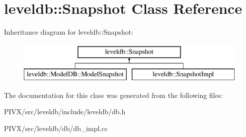 \hypertarget{classleveldb_1_1_snapshot}{}\section{leveldb\+:\+:Snapshot Class Reference}
\label{classleveldb_1_1_snapshot}
Inheritance diagram for leveldb\+:\+:Snapshot\+:\begin{figure}[H]
\begin{center}
\leavevmode
\includegraphics[height=2.000000cm]{classleveldb_1_1_snapshot}
\end{center}
\end{figure}


The documentation for this class was generated from the following files\+:\begin{DoxyCompactItemize}
\item 
P\+I\+V\+X/src/leveldb/include/leveldb/db.\+h\item 
P\+I\+V\+X/src/leveldb/db/db\+\_\+impl.\+cc\end{DoxyCompactItemize}
